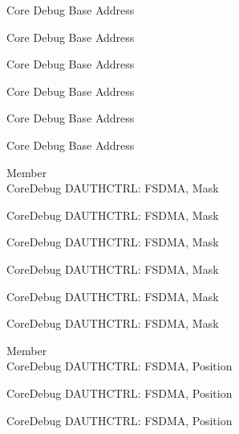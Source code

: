 \begin{DoxyRefList}
\label{deprecated__deprecated000888}%
%
Core Debug Base Address 

\label{deprecated__deprecated000951}%
%
Core Debug Base Address 

\label{deprecated__deprecated001030}%
%
Core Debug Base Address 

\label{deprecated__deprecated001106}%
%
Core Debug Base Address 

\label{deprecated__deprecated001209}%
%
Core Debug Base Address 

\label{deprecated__deprecated001311}%
%
Core Debug Base Address  
\item[Member \doxylink{group___c_m_s_i_s___s_c_b_gab7f3f76af0236f8d3d3a090f50d4841a}{Core\+Debug\+\_\+\+DAUTHCTRL\+\_\+\+FSDMA\+\_\+\+Msk} ]\hfill \\
\label{deprecated__deprecated000084}%
%
Core\+Debug DAUTHCTRL\+: FSDMA, Mask 

\label{deprecated__deprecated000535}%
%
Core\+Debug DAUTHCTRL\+: FSDMA, Mask 

\label{deprecated__deprecated000637}%
%
Core\+Debug DAUTHCTRL\+: FSDMA, Mask 

\label{deprecated__deprecated000743}%
%
Core\+Debug DAUTHCTRL\+: FSDMA, Mask 

\label{deprecated__deprecated001194}%
%
Core\+Debug DAUTHCTRL\+: FSDMA, Mask 

\label{deprecated__deprecated001296}%
%
Core\+Debug DAUTHCTRL\+: FSDMA, Mask  
\item[Member \doxylink{group___c_m_s_i_s___s_c_b_ga2b4fde73cbbbb0adeb686dc20ff705de}{Core\+Debug\+\_\+\+DAUTHCTRL\+\_\+\+FSDMA\+\_\+\+Pos} ]\hfill \\
\label{deprecated__deprecated000083}%
%
Core\+Debug DAUTHCTRL\+: FSDMA, Position 

\label{deprecated__deprecated000534}%
%
Core\+Debug DAUTHCTRL\+: FSDMA, Position 

\label{deprecated__deprecated000636}%
%
Core\+Debug DAUTHCTRL\+: FSDMA, Position 


\end{DoxyRefList}
